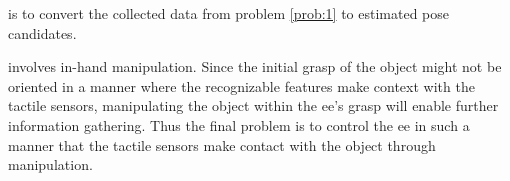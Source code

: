 \begin{problem} \label{prob:2}
	\normalfont is to convert the collected data from problem \ref{prob:1} to estimated pose candidates.
\end{problem}

\begin{problem} \label{prob:3}
	\normalfont involves in-hand manipulation. Since the initial grasp of the object might not be oriented in a manner where the recognizable features make context with the tactile sensors, manipulating the object within the \gls{ee}'s grasp will enable further information gathering. Thus the final problem is to control the \gls{ee} in such a manner that the tactile sensors make contact with the object through manipulation.
\end{problem}






